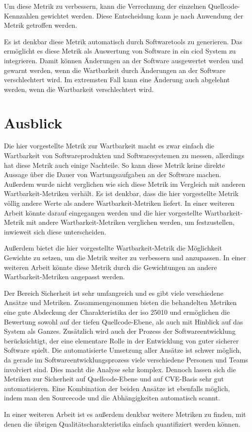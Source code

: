 \documentclass[12pt, a4paper, ngerman]{article}
\begin{document}
Um diese Metrik zu verbessern,
kann die Verrechnung der einzelnen Quellcode-Kennzahlen
gewichtet werden.
Diese Entscheidung kann je nach Anwendung der Metrik getroffen werden.

Es ist denkbar diese Metrik automatisch durch
Softwaretools zu generieren.
Das ermöglicht es diese Metrik als Auswertung von Software
in ein \ac{cicd} System zu integrieren.
Damit können Änderungen an der Software ausgewertet werden
und gewarnt werden, wenn die Wartbarkeit durch Änderungen an der Software verschlechtert wird.
Im extremsten Fall kann eine Änderung auch abgelehnt werden, wenn die Wartbarkeit verschlechtert wird.

\section{Ausblick}

Die hier vorgestellte Metrik zur Wartbarkeit macht es zwar einfach
die Wartbarkeit von Softwareprodukten und Softwaresystemen
zu messen, allerdings hat diese Metrik auch einige Nachteile.
So kann diese Metrik keine direkte Aussage über die Dauer 
von Wartungsaufgaben an der Software machen.
Außerdem wurde nicht verglichen wie sich diese Metrik 
im Vergleich mit anderen Wartbarkeit-Metriken verhält.
Es ist denkbar, dass die hier vorgestellte Metrik
völlig andere Werte als andere Wartbarkeit-Metriken liefert.
In einer weiteren Arbeit könnte darauf eingegangen werden
und die hier vorgestellte Wartbarkeit-Metrik
mit andere Wartbarkeit-Metriken verglichen werden,
um festzustellen, inwieweit sich diese unterscheiden.

Außerdem bietet die hier vorgestellte Wartbarkeit-Metrik 
die Möglichkeit Gewichte zu setzen, 
um die Metrik weiter zu verbessern und anzupassen.
In einer weiteren Arbeit könnte diese Metrik durch
die Gewichtungen an andere Wartbarkeit-Metriken angepasst werden.

Der Bereich Sicherheit ist sehr umfangreich und es gibt viele verschiedene Ansätze und Metriken.
Zusammengenommen bieten die behandelten Metriken eine gute Abdeckung der Charakteristika der \ac{iso} 25010 und 
ermöglichen die Bewertung sowohl auf der tiefen Quellcode-Ebene, als auch mit Hinblick auf das System als Ganzes.
Zusätzlich wird auch der Prozess der Softwareentwicklung berücksichtigt, 
der eine elementare Rolle in der Entwicklung von guter sicherer Software spielt. 
Die automatisierte Umsetzung aller Ansätze ist schwer möglich, 
da gerade im Softwareentwicklungsprozess viele verschiedene Personen und Teams involviert sind.
Dies macht die Analyse sehr komplex.
Dennoch lassen sich die Metriken zur Sicherheit auf Quellcode-Ebene und auf CVE-Basis sehr gut automatisieren.
Eine Kombination der beiden Ansätze ist ebenfalls möglich, indem man den Sourcecode und die Abhängigkeiten automatisch scannt. 

In einer weiteren Arbeit ist es außerdem denkbar weitere Metriken zu finden,
mit denen die übrigen Qualitätscharakteristika 
einfach quantifiziert werden können.


\newpage
\printbibliography
\end{document}
